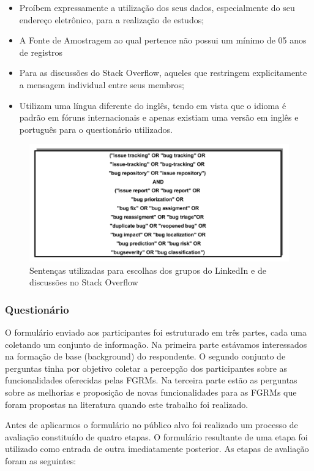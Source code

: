 \begin{itemize}
	\item Proíbem expressamente a utilização dos seus dados, especialmente do
		seu endereço eletrônico, para a realização de estudos;
	\item A Fonte de Amostragem ao qual pertence não possui um mínimo de 05 anos
		de registros
	\item Para as discussões do Stack Overflow, aqueles que restringem
		explicitamente a mensagem individual entre seus membros;
    \item Utilizam uma língua diferente do inglês, tendo em vista que o idioma
		 é padrão em fóruns internacionais e apenas existiam uma versão em
		inglês e português para o questionário utilizados.
\end{itemize}

\begin{figure}[htpb]
	\centering
	\includegraphics[width=0.6\linewidth]{./chapter-pesquisa-com-profissionais/img/setencas-grupos.pdf}
	\caption{Sentenças utilizadas para escolhas dos grupos do LinkedIn e de
		discussões no Stack Overflow}
\label{fig:setencas-grupos}
\end{figure}

\subsubsection{Questionário}
\label{subsubsec:questionario}

O formulário enviado aos participantes foi estruturado em três partes, cada uma
coletando um conjunto de informação. Na primeira parte estávamos interessados na
formação de base (background) do respondente. O segundo conjunto de perguntas
tinha por objetivo  coletar a percepção dos participantes sobre as
funcionalidades oferecidas pelas FGRMs\@. Na terceira parte estão as perguntas
sobre as melhorias e proposição de novas funcionalidades para as FGRMs que foram
propostas na literatura quando este trabalho foi realizado.

Antes de aplicarmos o formulário no público alvo foi realizado um processo de
avaliação constituído de quatro etapas. O formulário resultante de uma etapa foi
utilizado como entrada de outra imediatamente posterior. As etapas de avaliação
foram as seguintes:

